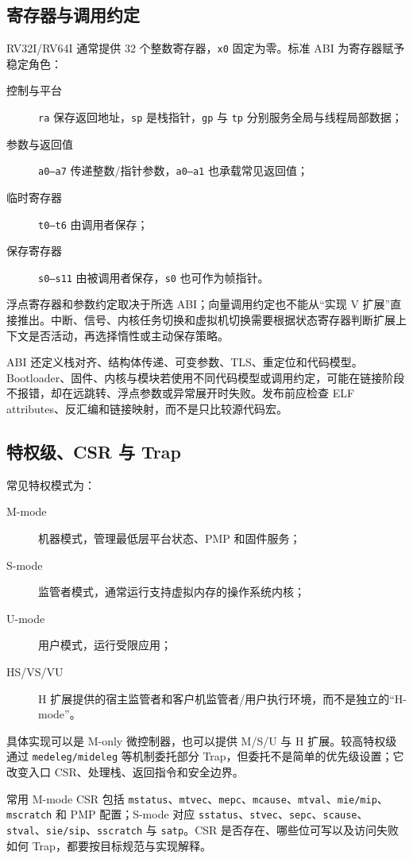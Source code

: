\subsection{寄存器与调用约定}

RV32I/RV64I 通常提供 32 个整数寄存器，\texttt{x0} 固定为零。标准 ABI 为寄存器赋予稳定角色：
\begin{description}
  \item[控制与平台] \texttt{ra} 保存返回地址，\texttt{sp} 是栈指针，\texttt{gp} 与 \texttt{tp} 分别服务全局与线程局部数据；
  \item[参数与返回值] \texttt{a0--a7} 传递整数/指针参数，\texttt{a0--a1} 也承载常见返回值；
  \item[临时寄存器] \texttt{t0--t6} 由调用者保存；
  \item[保存寄存器] \texttt{s0--s11} 由被调用者保存，\texttt{s0} 也可作为帧指针。
\end{description}

浮点寄存器和参数约定取决于所选 ABI；向量调用约定也不能从“实现 V 扩展”直接推出。中断、信号、内核任务切换和虚拟机切换需要根据状态寄存器判断扩展上下文是否活动，再选择惰性或主动保存策略。

ABI 还定义栈对齐、结构体传递、可变参数、TLS、重定位和代码模型。Bootloader、固件、内核与模块若使用不同代码模型或调用约定，可能在链接阶段不报错，却在远跳转、浮点参数或异常展开时失败。发布前应检查 ELF attributes、反汇编和链接映射，而不是只比较源代码宏。

\subsection{特权级、CSR 与 Trap}

常见特权模式为：
\begin{description}
  \item[M-mode] 机器模式，管理最低层平台状态、PMP 和固件服务；
  \item[S-mode] 监管者模式，通常运行支持虚拟内存的操作系统内核；
  \item[U-mode] 用户模式，运行受限应用；
  \item[HS/VS/VU] H 扩展提供的宿主监管者和客户机监管者/用户执行环境，而不是独立的“H-mode”。
\end{description}

具体实现可以是 M-only 微控制器，也可以提供 M/S/U 与 H 扩展。较高特权级通过 \texttt{medeleg/mideleg} 等机制委托部分 Trap，但委托不是简单的优先级设置；它改变入口 CSR、处理栈、返回指令和安全边界。

常用 M-mode CSR 包括 \texttt{mstatus}、\texttt{mtvec}、\texttt{mepc}、\texttt{mcause}、\texttt{mtval}、\texttt{mie/mip}、\texttt{mscratch} 和 PMP 配置；S-mode 对应 \texttt{sstatus}、\texttt{stvec}、\texttt{sepc}、\texttt{scause}、\texttt{stval}、\texttt{sie/sip}、\texttt{sscratch} 与 \texttt{satp}。CSR 是否存在、哪些位可写以及访问失败如何 Trap，都要按目标规范与实现解释。

